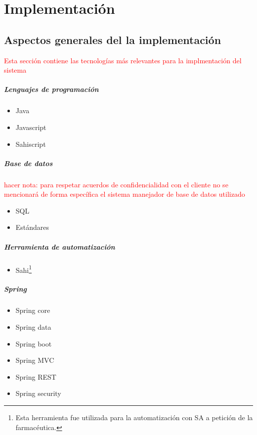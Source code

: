 \chapter{Implementación}\label{cap4}

\section{Aspectos generales del la implementación}
\textcolor{red}{Esta sección contiene las tecnologías más relevantes para la implmentación del sistema}
\paragraph{Lenguajes de programación}
	\begin{itemize}
		\item Java
		\item Javascript
		\item Sahiscript
	\end{itemize}
\paragraph{Base de datos}
	\textcolor{red}{hacer nota: para respetar acuerdos de confidencialidad con el cliente no se mencionará de forma específica el sistema manejador de base de datos utilizado}
	\begin{itemize}
		\item SQL
		\item Estándares
	\end{itemize}

\paragraph{Herramienta de automatización}
	\begin{itemize}
		\item Sahi\footnote{Esta herramienta fue utilizada para la automatización con SA a petición de la farmacéutica.}
	\end{itemize}
\paragraph{Spring}
	\begin{itemize}
		\item Spring core\cite{SpringInAction}
		\item Spring data\cite{SpringInAction}
		\item Spring boot\cite{SpringBootInAction}
		\item Spring MVC\cite{SpringInAction}
		\item Spring REST\cite{SpringInAction}
		\item Spring security\cite{ProSpringSecurity}
	\end{itemize}

